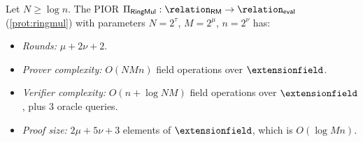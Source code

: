 \begin{theorem}\label{thm:efficiency}
Let $N \ge \log n$. The PIOR $\Pi_{\mathsf{RingMul}}: \relation_{\mathsf{RM}} \to \relation_{\mathsf{eval}}$ (\cref{prot:ringmul}) with parameters $N=2^\tau$, $M=2^\mu$, $n=2^\nu$ has:
\begin{itemize}[nosep]
    \item \emph{Rounds:} $\mu + 2\nu + 2$.
    \item \emph{Prover complexity:} $O(NMn)$ field operations over $\extensionfield$.
    \item \emph{Verifier complexity:} $O(n + \log NM)$ field operations over $\extensionfield$, plus $3$ oracle queries.
    \item \emph{Proof size:} $2\mu+5\nu+3$ elements of $\extensionfield$, which is $O(\log Mn)$.
\end{itemize}
\end{theorem}
